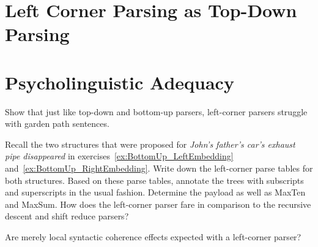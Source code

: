 \section{Left Corner Parsing as Top-Down Parsing} 

\section{Psycholinguistic Adequacy}
\label{sec:LeftCorner_Evaluation}

\begin{exercise}
    Show that just like top-down and bottom-up parsers, left-corner parsers struggle with garden path sentences.
\end{exercise}

\begin{exercise}
    Recall the two structures that were proposed for \emph{John's father's car's exhaust pipe disappeared} in exercises~\ref{ex:BottomUp_LeftEmbedding} and~\ref{ex:BottomUp_RightEmbedding}.
    Write down the left-corner parse tables for both structures.
    Based on these parse tables, annotate the trees with subscripts and superscripts in the usual fashion.
    Determine the payload as well as MaxTen and MaxSum.
    How does the left-corner parser fare in comparison to the recursive descent and shift reduce parsers?
\end{exercise}

\begin{exercise}
    Are merely local syntactic coherence effects expected with a left-corner parser?
\end{exercise}



